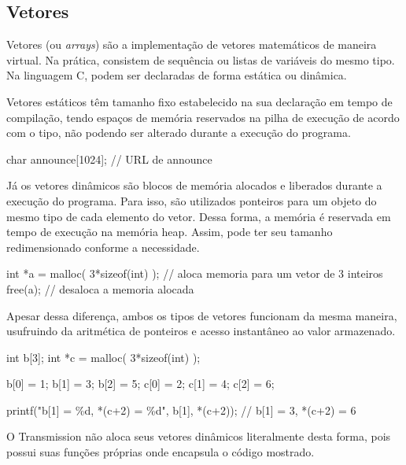 
\subsection*{Vetores}

Vetores (ou \emph{arrays}) são a implementação de vetores matemáticos de maneira
virtual. Na prática, consistem de sequência ou listas de variáveis do mesmo tipo. Na
linguagem C, podem ser declaradas de forma estática ou dinâmica.

Vetores estáticos têm tamanho fixo estabelecido na sua declaração em tempo de
compilação, tendo espaços de memória reservados na pilha de execução de acordo com o
tipo, não podendo ser alterado durante a execução do programa.

\begin{ccode}
    char announce[1024]; // URL de announce
\end{ccode}

Já os vetores dinâmicos são blocos de memória alocados e liberados durante a execução do
programa. Para isso, são utilizados ponteiros para um objeto do mesmo tipo de cada
elemento do vetor. Dessa forma, a memória é reservada em tempo de execução na memória
heap. Assim, pode ter seu tamanho redimensionado conforme a necessidade.

\begin{ccode}
    int *a = malloc( 3*sizeof(int) ); // aloca memoria para um vetor de 3 inteiros
    free(a);                          // desaloca a memoria alocada
\end{ccode}

Apesar dessa diferença, ambos os tipos de vetores funcionam da mesma maneira, usufruindo
da aritmética de ponteiros e acesso instantâneo ao valor armazenado.

\begin{ccode}
    int b[3];
    int *c = malloc( 3*sizeof(int) );

    b[0] = 1; b[1] = 3; b[2] = 5;
    c[0] = 2; c[1] = 4; c[2] = 6;

    printf("b[1] = \%d, *(c+2) = \%d\n", b[1], *(c+2)); // b[1] = 3, *(c+2) = 6
\end{ccode}

O Transmission não aloca seus vetores dinâmicos literalmente desta forma, pois possui
suas funções próprias onde encapsula o código mostrado.